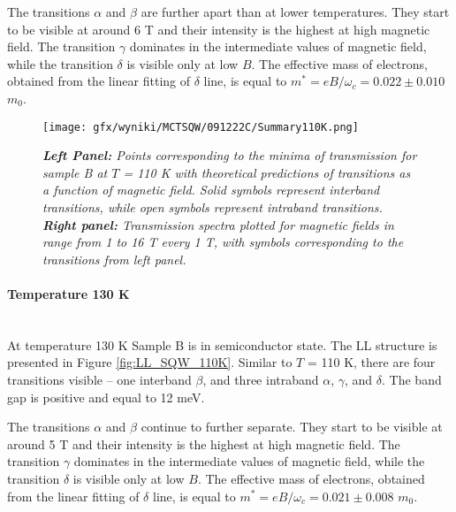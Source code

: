 \documentclass[titlepage,a4paper]{book}
\newcommand{\wciecie}{\quad\phantom{v}}
\newcommand{\myparagraph}[1]{\paragraph{#1}\mbox{}\\}
\begin{document}
The transitions $\alpha$ and $\beta$ are further apart than at lower temperatures. They start to be visible at around 6 T and their intensity is the highest at high magnetic field. The transition $\gamma$ dominates in the intermediate values of magnetic field, while the transition $\delta$ is visible only at low $B$. The effective mass of electrons, obtained from the linear fitting of $\delta$ line, is equal to $m^* = eB/\omega_c = 0.022 \pm 0.010$ $m_0$.

\begin{figure}[H]
	\centering
	\texttt{[image: gfx/wyniki/MCTSQW/091222C/Summary110K.png]}
	\vspace{-10pt}
	\caption{\textit{\textbf{Left Panel:} Points corresponding to the minima of transmission for sample B at $T$ = 110 K with theoretical predictions of transitions as a function of magnetic field. Solid symbols represent interband transitions, while open symbols represent intraband transitions. \textbf{Right panel:} Transmission spectra plotted for magnetic fields in range from 1 to 16 T every 1 T, with symbols corresponding to the transitions from left panel.}}
	\label{fig:Summary_SQW_110K}
\end{figure}

\myparagraph{Temperature 130 K}
\wciecie
At temperature 130 K Sample B is in semiconductor state. The LL structure is presented in Figure \ref{fig:LL_SQW_110K}. Similar to $T$ = 110 K, there are four transitions visible -- one interband $\beta$, and three intraband $\alpha$, $\gamma$, and $\delta$. The band gap is positive and equal to 12 meV.

The transitions $\alpha$ and $\beta$ continue to further separate. They start to be visible at around 5 T and their intensity is the highest at high magnetic field. The transition $\gamma$ dominates in the intermediate values of magnetic field, while the transition $\delta$ is visible only at low $B$. The effective mass of electrons, obtained from the linear fitting of $\delta$ line, is equal to $m^* = eB/\omega_c = 0.021 \pm 0.008$ $m_0$.
\end{document}
